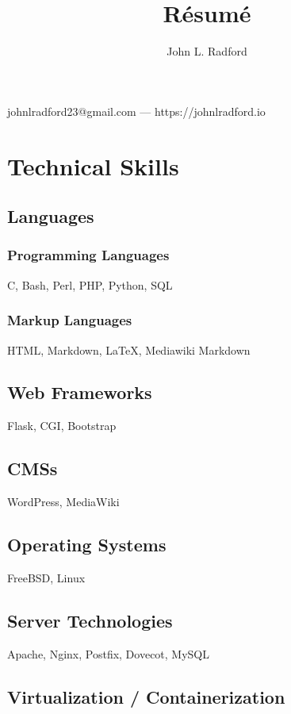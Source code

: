 \documentclass{article}
\makeatletter
\renewcommand{\maketitle}{
\begin{center}
{\huge\bfseries
\theauthor}

\vspace{.25em}

johnlradford23@gmail.com --- https://johnlradford.io

\end{center}
}
\makeatother
\begin{document}
\title{R\'esum\'e}
\author{John L. Radford}

\maketitle

\section{Technical Skills}

\subsection{Languages}

\subsubsection{Programming Languages}

C, Bash, Perl, PHP, Python, SQL

\subsubsection{Markup Languages}

HTML, Markdown, {\LaTeX}, Mediawiki Markdown

\subsection{Web Frameworks}

Flask, CGI, Bootstrap

\subsection{CMSs}

WordPress, MediaWiki

\subsection{Operating Systems}

FreeBSD, Linux

\subsection{Server Technologies}

Apache, Nginx, Postfix, Dovecot, MySQL

\subsection{Virtualization / Containerization}
\end{document}
